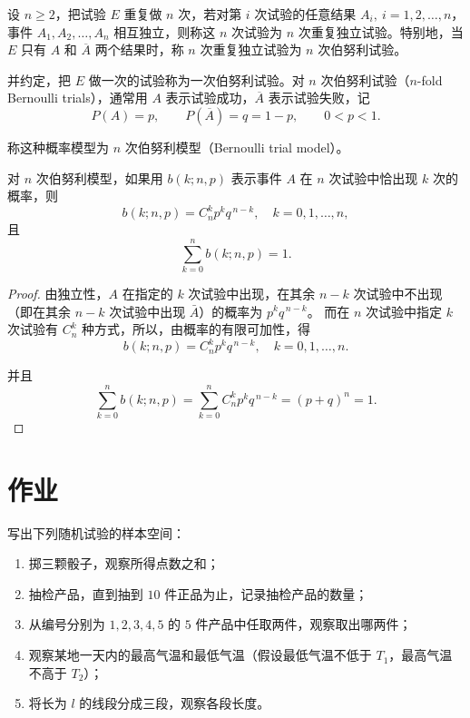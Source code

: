 \begin{definition}[伯努利模型]
设 $n \geq 2$，把试验 $E$ 重复做 $n$ 次，若对第 $i$ 次试验的任意结果 $A_i,\ i=1,2,\dots,n$，事件 $A_1,A_2,\dots,A_n$ 相互独立，则称这 $n$ 次试验为 $n$ 次重复独立试验。特别地，当 $E$ 只有 $A$ 和 $\overline{A}$ 两个结果时，称 $n$ 次重复独立试验为 $n$ 次伯努利试验。  

并约定，把 $E$ 做一次的试验称为一次伯努利试验。对 $n$ 次伯努利试验（$n$-fold Bernoulli trials），通常用 $A$ 表示试验成功，$\overline{A}$ 表示试验失败，记
\[
P(A)=p,\qquad P(\overline{A})=q=1-p,\qquad 0<p<1.
\]

称这种概率模型为 $n$ 次伯努利模型（Bernoulli trial model）。
\end{definition}
\begin{theorem}[由于都是独立事件所以用排列组合即可]
对 $n$ 次伯努利模型，如果用 $b(k; n, p)$ 表示事件 $A$ 在 $n$ 次试验中恰出现 $k$ 次的概率，则
\[
b(k; n, p) = C_n^k p^k q^{\,n-k}, \quad k = 0,1,\ldots,n,
\]
且
\[
\sum_{k=0}^n b(k; n, p) = 1.
\]
\end{theorem}

\begin{proof}
由独立性，$A$ 在指定的 $k$ 次试验中出现，在其余 $n-k$ 次试验中不出现（即在其余 $n-k$ 次试验中出现 $\bar A$）的概率为 $p^k q^{\,n-k}$。  
而在 $n$ 次试验中指定 $k$ 次试验有 $C_n^k$ 种方式，所以，由概率的有限可加性，得
\[
b(k; n, p) = C_n^k p^k q^{\,n-k}, \quad k = 0,1,\ldots,n.
\]

并且
\[
\sum_{k=0}^n b(k; n, p) 
= \sum_{k=0}^n C_n^k p^k q^{\,n-k} 
= (p+q)^n = 1.
\]
\end{proof}


\section{作业}

\begin{homework}[1.1]
写出下列随机试验的样本空间：

\begin{enumerate}
  \item 掷三颗骰子，观察所得点数之和；
  \item 抽检产品，直到抽到 $10$ 件正品为止，记录抽检产品的数量；
  \item 从编号分别为 $1,2,3,4,5$ 的 $5$ 件产品中任取两件，观察取出哪两件；
  \item 观察某地一天内的最高气温和最低气温（假设最低气温不低于 $T_1$，最高气温不高于 $T_2$）；
  \item 将长为 $l$ 的线段分成三段，观察各段长度。
\end{enumerate}
\end{homework}

